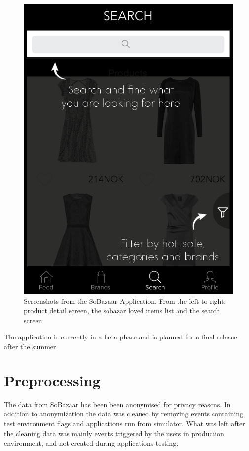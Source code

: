\begin{figure}[H]
\begin{minipage}{.3\linewidth}
				  \includegraphics[height=1.5\linewidth]{image/SoBazaarsearch.png}
			\end{minipage}
			\caption[SoBazaar functionality screenshots - version 0.5.1]{Screenshots from the SoBazaar Application. From the left to right: product detail screen, the sobazar loved items list and the search screen}
			\label{figure:SoBazaarfeed}
	\end{figure}

	The application is currently in a beta phase and is planned for a final release after the summer.

\section{Preprocessing}
    \label{sec:preprocessing}
    The data from SoBazaar has been been anonymised for privacy reasons.
    In addition to anonymization the data was cleaned by removing events containing test environment flags and applications run from simulator.
    What was left after the cleaning data was mainly events triggered by the users in production environment, and not created during applications testing.

